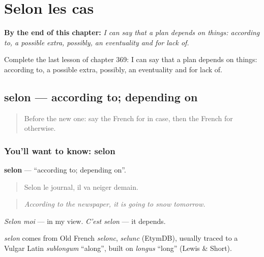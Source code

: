 
\chapter{Selon les cas}
\label{ch:fr-selon-les-cas}

\begin{chapteropening}
\textbf{By the end of this chapter:} \emph{I can say that a plan depends on things: according to, a possible extra, possibly, an eventuality and for lack of.}

Complete the last lesson of chapter 369: I can say that a plan depends on things: according to, a possible extra, possibly, an eventuality and for lack of.
\end{chapteropening}

\section[selon]{selon — according to; depending on}

\label{lesson:FR-C369-selon}



\begin{quote}
Before the new one: say the French for in case, then the French for otherwise.
\end{quote}

\subsection*{You'll want to know: selon}
\textbf{selon} — \textquotedblleft{}according to; depending on\textquotedblright{}.

\begin{quote}
Selon le journal, il va neiger demain.
\end{quote}

\begin{quote}
\emph{According to the newspaper, it is going to snow tomorrow.}
\end{quote}

\emph{Selon moi} — in my view. \emph{C'est selon} — it depends.

\begin{cousinweb}
\emph{selon} comes from Old French \emph{selonc}, \emph{selunc} (EtymDB), usually traced to a Vulgar Latin \emph{sublongum} \textquotedblleft{}along\textquotedblright{}, built on \emph{longus} \textquotedblleft{}long\textquotedblright{} (Lewis \& Short).
\end{cousinweb}

